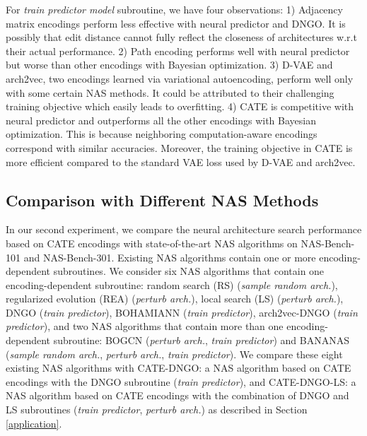 For \emph{train predictor model} subroutine, we have four observations: 
1) Adjacency matrix encodings perform less effective with neural predictor and DNGO. It is possibly that edit distance cannot fully reflect the closeness of architectures w.r.t their actual performance. 
2) Path encoding performs well with neural predictor but worse than other encodings with Bayesian optimization.
3) D-VAE and arch2vec, two encodings learned via variational autoencoding, perform well only with some certain NAS methods. It could be attributed to their challenging training objective which easily leads to overfitting. 
4) CATE is competitive with neural predictor and outperforms all the other encodings with Bayesian optimization. This is because neighboring computation-aware encodings correspond with similar accuracies. Moreover, the training objective in CATE is more efficient compared to the standard VAE loss \cite{kingma2013autoencoding} used by D-VAE and arch2vec.

\subsection{Comparison with Different NAS Methods}

In our second experiment, we compare the neural architecture search performance based on CATE encodings with state-of-the-art NAS algorithms on NAS-Bench-101 and NAS-Bench-301. Existing NAS algorithms contain one or more encoding-dependent subroutines. 
We consider six NAS algorithms that contain one encoding-dependent subroutine: random search (RS) \cite{Li2019RandomSA} (\emph{sample random arch.}), regularized evolution (REA) \cite{real2019regularized} (\emph{perturb arch.}), local search (LS) \cite{white2020local} (\emph{perturb arch.}), DNGO \cite{snoek2015scalable} (\emph{train predictor}), BOHAMIANN \cite{NIPS2016_springenberg} (\emph{train predictor}), arch2vec-DNGO \cite{yan2020arch} (\emph{train predictor}), and two NAS algorithms that contain more than one encoding-dependent subroutine: BOGCN \cite{shi2019multiobjective} (\emph{perturb arch.}, \emph{train predictor}) and BANANAS \cite{white2019bananas} (\emph{sample random arch.}, \emph{perturb arch.}, \emph{train predictor}). 
We compare these eight existing NAS algorithms with CATE-DNGO: a NAS algorithm  based on CATE encodings with the DNGO subroutine (\emph{train predictor}), and CATE-DNGO-LS: a NAS algorithm based on CATE encodings with the combination of DNGO and LS subroutines (\emph{train predictor}, \emph{perturb arch.}) as described in Section \ref{application}.




